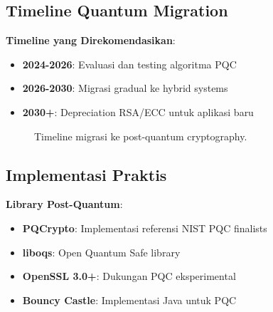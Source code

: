 \subsection{Timeline Quantum Migration}

\textbf{Timeline yang Direkomendasikan}:
\begin{itemize}
  \item \textbf{2024-2026}: Evaluasi dan testing algoritma PQC
  \item \textbf{2026-2030}: Migrasi gradual ke hybrid systems
  \item \textbf{2030+}: Depreciation RSA/ECC untuk aplikasi baru
\end{itemize}

\begin{figure}[htbp]
  \centering
  \caption{Timeline migrasi ke post-quantum cryptography.}
\end{figure}

\subsection{Implementasi Praktis}

\textbf{Library Post-Quantum}:
\begin{itemize}
  \item \textbf{PQCrypto}: Implementasi referensi NIST PQC finalists
  \item \textbf{liboqs}: Open Quantum Safe library
  \item \textbf{OpenSSL 3.0+}: Dukungan PQC eksperimental
  \item \textbf{Bouncy Castle}: Implementasi Java untuk PQC
\end{itemize}

